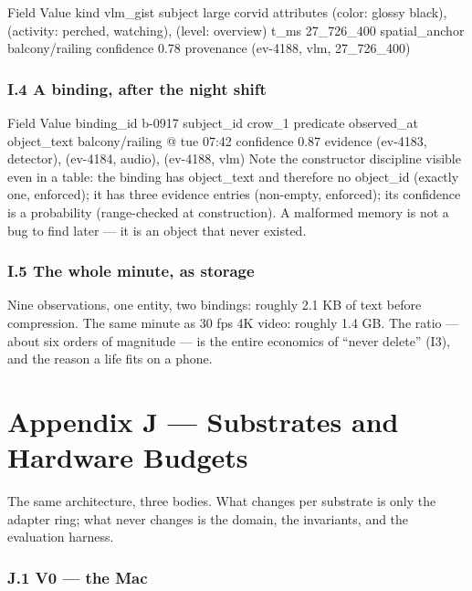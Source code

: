 Field Value kind vlm\_gist subject large corvid attributes (color: glossy black), (activity: perched, watching), (level: overview) t\_ms 27\_726\_400 spatial\_anchor balcony/railing confidence 0.78 provenance (ev-4188, vlm, 27\_726\_400)

\subsection{I.4 A binding, after the night shift}\label{i.4-a-binding-after-the-night-shift}

Field Value binding\_id b-0917 subject\_id crow\_1 predicate observed\_at object\_text balcony/railing @ tue 07:42 confidence 0.87 evidence (ev-4183, detector), (ev-4184, audio), (ev-4188, vlm) Note the constructor discipline visible even in a table: the binding has object\_text and therefore no object\_id (exactly one, enforced); it has three evidence entries (non-empty, enforced); its confidence is a probability (range-checked at construction). A malformed memory is not a bug to find later --- it is an object that never existed.

\subsection{I.5 The whole minute, as storage}\label{i.5-the-whole-minute-as-storage}

Nine observations, one entity, two bindings: roughly 2.1 KB of text before compression. The same minute as 30 fps 4K video: roughly 1.4 GB. The ratio --- about six orders of magnitude --- is the entire economics of ``never delete'' (I3), and the reason a life fits on a phone.

\chapter*{Appendix J --- Substrates and Hardware Budgets}\label{appendix-j-substrates-and-hardware-budgets}

The same architecture, three bodies. What changes per substrate is only the adapter ring; what never changes is the domain, the invariants, and the evaluation harness.

\subsection{J.1 V0 --- the Mac}\label{j.1-v0-the-mac}

